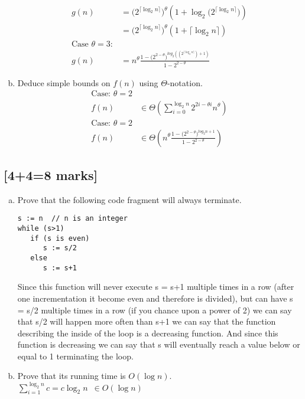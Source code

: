\documentclass[12pt]{article}
\begin{document}
\begin{enumerate}[(a)]
\begin{align*}
g(n)&= \bigg(2^{\lceil \log_2 n \rceil}\bigg)^{\theta}(1+ \log_2 \bigg(2^{\lceil \log_2 n \rceil}\bigg))\\
&= \bigg(2^{\lceil \log_2 n \rceil}\bigg)^{\theta}(1+ \lceil \log_2 n \rceil)\\
\text{Case }\theta = 3:&\\
g(n) &= n^{\theta}\frac{1-\bigg (2^{2-\theta}\bigg )^{log_2 ((2^{\lceil \log_2 n\rceil}) + 1)}}{1-2^{2-\theta}}
\end{align*}
\item Deduce simple bounds on $f(n)$ using $\Theta$-notation.
\begin{align*}
\text{Case: }\theta = 2 &\\
f(n) &\in \Theta(\displaystyle\sum_{i=0}^{\log_2 n} 2^{2i-\theta i} n^{\theta})\\
\text{Case: } \theta = 2&\\
f(n)&\in \Theta(n^{\theta}\frac{1-\bigg (2^{2-\theta}\bigg )^{log_2 n + 1}}{1-2^{2-\theta}})
\end{align*}
\end{enumerate}
\subsection{[4+4=8 marks]}
\begin{enumerate}[(a)]
\item Prove that the following code fragment will always terminate.
\begin{verbatim}
s := n  // n is an integer
while (s>1)
   if (s is even)
      s := s/2
   else
      s := s+1
\end{verbatim}
Since this function will never execute s = s+1 multiple times in a row (after one incrementation it become even and therefore is divided), but can have s = s/2 multiple times in a row (if you chance upon a power of 2) we can say that s/2 will happen more often than s+1 we can say that the function describing the inside of the loop is a decreasing function. And since this function is decreasing we can say that s will eventually reach a value below or equal to 1 terminating the loop.
\item Prove that its running time is $O(\log n)$.\\
$\displaystyle\sum_{i=1}^{\log_2 n}c = c\log_2 n \enspace \in O(\log n)$\\
\end{enumerate}

\end{document}
